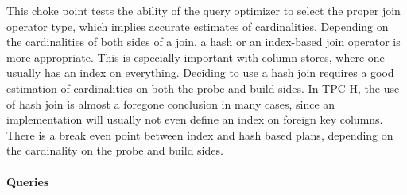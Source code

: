 
This choke point tests the ability of the query optimizer to select the proper
join operator type, which implies accurate estimates of cardinalities. Depending
on the cardinalities of both sides of a join, a hash or an index-based join
operator is more appropriate. This is especially important with column stores,
where one usually has an index on everything. Deciding to use a hash join
requires a good estimation of cardinalities on both the probe and build sides.
In TPC-H, the use of hash join is almost a foregone conclusion in many cases,
since an implementation will usually not even define an index on foreign key
columns. There is a break even point between index and hash based plans,
depending on the cardinality on the probe and build sides.


\paragraph{Queries}
{\raggedright
}